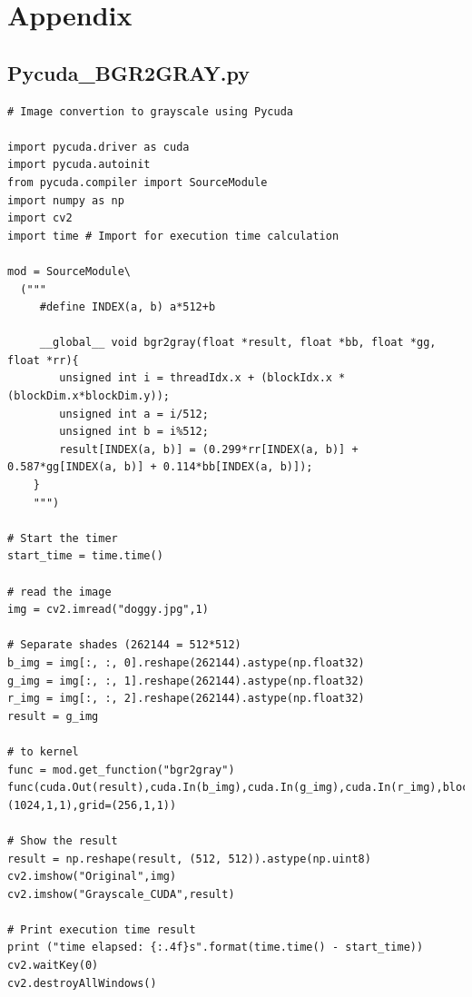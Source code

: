 \documentclass[11pt]{article}
\begin{document}
\newpage
\section*{Appendix}\label{sec:app}
\subsection*{Pycuda\_BGR2GRAY.py}
\begin{lstlisting}
# Image convertion to grayscale using Pycuda

import pycuda.driver as cuda
import pycuda.autoinit
from pycuda.compiler import SourceModule
import numpy as np
import cv2
import time # Import for execution time calculation

mod = SourceModule\
  ("""
     #define INDEX(a, b) a*512+b

     __global__ void bgr2gray(float *result, float *bb, float *gg, float *rr){
        unsigned int i = threadIdx.x + (blockIdx.x * (blockDim.x*blockDim.y));
        unsigned int a = i/512;
        unsigned int b = i%512;
        result[INDEX(a, b)] = (0.299*rr[INDEX(a, b)] + 0.587*gg[INDEX(a, b)] + 0.114*bb[INDEX(a, b)]);
    }
    """)

# Start the timer
start_time = time.time()

# read the image
img = cv2.imread("doggy.jpg",1)

# Separate shades (262144 = 512*512)
b_img = img[:, :, 0].reshape(262144).astype(np.float32)
g_img = img[:, :, 1].reshape(262144).astype(np.float32)
r_img = img[:, :, 2].reshape(262144).astype(np.float32)
result = g_img

# to kernel
func = mod.get_function("bgr2gray")
func(cuda.Out(result),cuda.In(b_img),cuda.In(g_img),cuda.In(r_img),block=(1024,1,1),grid=(256,1,1))

# Show the result
result = np.reshape(result, (512, 512)).astype(np.uint8)
cv2.imshow("Original",img)
cv2.imshow("Grayscale_CUDA",result)

# Print execution time result
print ("time elapsed: {:.4f}s".format(time.time() - start_time))
cv2.waitKey(0)
cv2.destroyAllWindows()
\end{lstlisting}


\newpage
\end{document}

